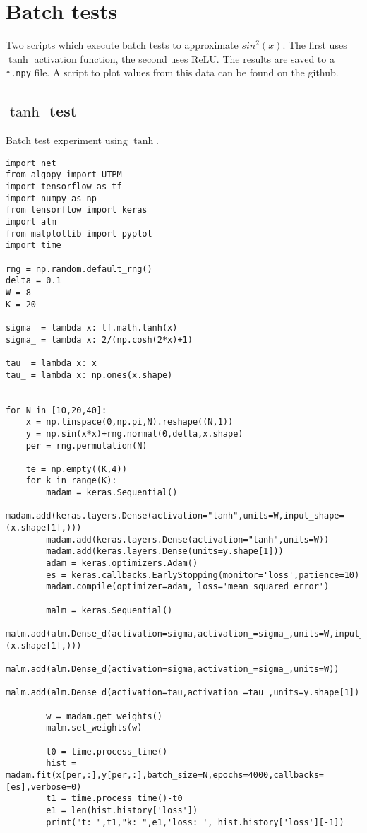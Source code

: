 \section{Batch tests}
\label{sin2test}
Two scripts which execute batch tests to approximate $sin^2(x)$. The first uses $\tanh$ activation function, the second uses ReLU. The results are saved to a \texttt{*.npy} file. A script to plot values from this data can be found on the github.
\subsection{$\tanh$ test}
Batch test experiment using $\tanh$.
\begin{verbatim}
import net
from algopy import UTPM
import tensorflow as tf
import numpy as np
from tensorflow import keras
import alm
from matplotlib import pyplot
import time

rng = np.random.default_rng()
delta = 0.1
W = 8
K = 20

sigma  = lambda x: tf.math.tanh(x)
sigma_ = lambda x: 2/(np.cosh(2*x)+1)

tau  = lambda x: x
tau_ = lambda x: np.ones(x.shape)


for N in [10,20,40]:
    x = np.linspace(0,np.pi,N).reshape((N,1))
    y = np.sin(x*x)+rng.normal(0,delta,x.shape)
    per = rng.permutation(N)

    te = np.empty((K,4))
    for k in range(K):
        madam = keras.Sequential() 
        madam.add(keras.layers.Dense(activation="tanh",units=W,input_shape=(x.shape[1],)))
        madam.add(keras.layers.Dense(activation="tanh",units=W))
        madam.add(keras.layers.Dense(units=y.shape[1]))
        adam = keras.optimizers.Adam()
        es = keras.callbacks.EarlyStopping(monitor='loss',patience=10)
        madam.compile(optimizer=adam, loss='mean_squared_error')

        malm = keras.Sequential()
        malm.add(alm.Dense_d(activation=sigma,activation_=sigma_,units=W,input_shape=(x.shape[1],)))
        malm.add(alm.Dense_d(activation=sigma,activation_=sigma_,units=W))
        malm.add(alm.Dense_d(activation=tau,activation_=tau_,units=y.shape[1]))
    
        w = madam.get_weights()
        malm.set_weights(w)
        
        t0 = time.process_time()
        hist = madam.fit(x[per,:],y[per,:],batch_size=N,epochs=4000,callbacks=[es],verbose=0)
        t1 = time.process_time()-t0
        e1 = len(hist.history['loss'])
        print("t: ",t1,"k: ",e1,'loss: ', hist.history['loss'][-1])


\end{verbatim}
